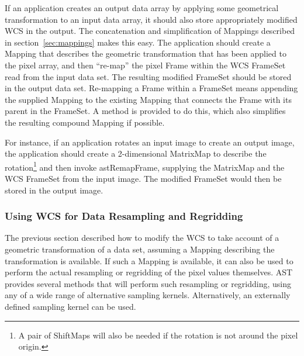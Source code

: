 \documentclass[final,authoryear,5p,times,twocolumn]{elsarticle}
\begin{document}
If an application creates an output data array by applying some geometrical
transformation to an input data array, it should also store appropriately
modified WCS in the output. The concatenation and simplification of
Mappings described in section~\ref{sec:mappings} makes this easy. The
application should create a Mapping that describes the geometric
transformation that has been applied to the pixel array, and then
``re-map'' the pixel Frame within the WCS FrameSet read from the input
data set. The resulting modified FrameSet should be stored in the output
data set. Re-mapping a Frame within a FrameSet means appending the
supplied Mapping to the existing Mapping that connects the Frame with its
parent in the FrameSet. A method is provided to do this, which also simplifies
the resulting compound Mapping if possible.

For instance, if an application rotates an input image to create an
output image, the application should create a 2-dimensional MatrixMap to
describe the rotation\footnote{A pair of ShiftMaps will also be needed if
the rotation is not around the pixel origin.} and then invoke
astRemapFrame, supplying the MatrixMap and the WCS FrameSet from the
input image. The modified FrameSet would then be stored in the output
image.

\subsubsection{Using WCS for Data Resampling and Regridding}
The previous section described how to modify the WCS to take account of a
geometric transformation of a data set, assuming a Mapping describing the
transformation is available. If such a Mapping is available, it can also
be used to perform the actual resampling or regridding of the pixel
values themselves. AST provides several methods that will perform such
resampling or regridding, using any of a wide range of alternative
sampling kernels. Alternatively, an externally defined sampling kernel
can be used.
\end{document}
